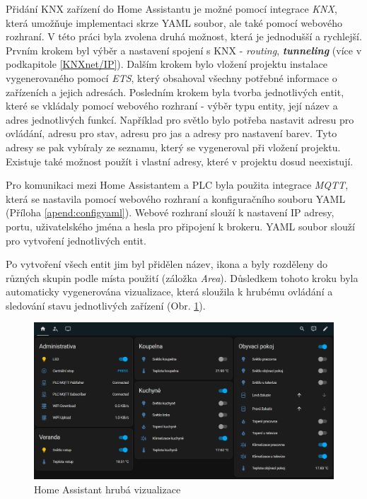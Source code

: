 Přidání KNX zařízení do Home Assistantu je možné pomocí integrace \textit{KNX}, která umožňuje implementaci skrze YAML soubor, ale také pomocí webového rozhraní. V této práci byla zvolena druhá možnost, která je jednodušší a rychlejší. Prvním krokem byl výběr a nastavení spojení s KNX - \textit{routing}, \textbf{\textit{tunneling}} (více v podkapitole \ref{KNXnet/IP}). Dalším krokem bylo vložení projektu instalace vygenerovaného pomocí \textit{ETS}, který obsahoval všechny potřebné informace o zařízeních a jejich adresách. Posledním krokem byla tvorba jednotlivých entit, které se vkládaly pomocí webového rozhraní - výběr typu entity, její název a adres jednotlivých funkcí. Například pro světlo bylo potřeba nastavit adresu pro ovládání, adresu pro stav, adresu pro jas a adresy pro nastavení barev. Tyto adresy se pak vybíraly ze seznamu, který se vygeneroval při vložení projektu. Existuje také možnost použít i vlastní adresy, které v projektu dosud neexistují.

Pro komunikaci mezi Home Assistantem a PLC byla použita integrace \textit{MQTT}, která se nastavila pomocí webového rozhraní a konfiguračního souboru YAML (Příloha \ref{apend:configyaml}). Webové rozhraní slouží k nastavení IP adresy, portu, uživatelského jména a hesla pro připojení k brokeru. YAML soubor slouží pro vytvoření jednotlivých entit.

Po vytvoření všech entit jim byl přidělen název, ikona a byly rozděleny do různých skupin podle místa použití (záložka \textit{Area}). Důsledkem tohoto kroku byla automaticky vygenerována vizualizace, která sloužila k hrubému ovládání a sledování stavu jednotlivých zařízení (Obr. \ref{fig:HAvisu1}).

\begin{figure}[!ht]
    \begin{center}
        \includegraphics[scale=0.35]{obrazky/Dashboard1.png}
    \end{center}
    \caption[Home Assistant hrubá vizualizace]{Home Assistant hrubá vizualizace}
    \label{fig:HAvisu1}
\end{figure}

